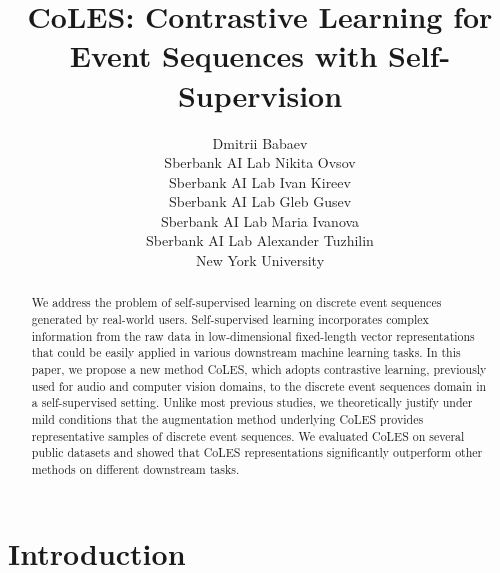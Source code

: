 \documentclass{article}
\title{CoLES: Contrastive Learning for Event Sequences with Self-Supervision}
\author{
Dmitrii Babaev \\
Sberbank AI Lab
\And
Nikita Ovsov \\
Sberbank AI Lab
\And
Ivan Kireev \\
Sberbank AI Lab
\And
Gleb Gusev \\
Sberbank AI Lab
\And
Maria Ivanova \\
Sberbank AI Lab
\And
Alexander Tuzhilin \\
New York University
}
\begin{document}
\maketitle

\begin{abstract}

We address the problem of self-supervised learning on discrete event sequences generated by real-world users. Self-supervised learning incorporates complex information from the raw data in low-dimensional fixed-length vector representations that could be easily applied in various downstream machine learning tasks. In this paper, we propose a new method CoLES, which adopts contrastive learning, previously used for audio and computer vision domains, to the discrete event sequences domain in a self-supervised setting. Unlike most previous studies, we theoretically justify under mild conditions that the augmentation method underlying CoLES provides representative samples of discrete event sequences. We evaluated CoLES on several public datasets and showed that CoLES representations significantly outperform other methods on different downstream tasks.

\end{abstract}

\section{Introduction} \label{sec-intro}

\end{document}
